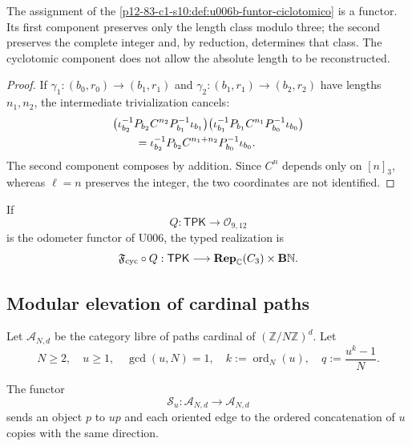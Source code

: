 {\begin{theorem}
\label{p12-83-c1-s10:thm:u006b-functorialidad}
The assignment of the \cref{p12-83-c1-s10:def:u006b-funtor-ciclotomico} is a functor. Its
first component preserves only the length class modulo three; the
second preserves the complete integer and, by reduction, determines that class.
The cyclotomic component does not allow the absolute length to be reconstructed.
\end{theorem}

\begin{proof}
If \(\gamma_1:(b_0,r_0)\to(b_1,r_1)\) and
\(\gamma_2:(b_1,r_1)\to(b_2,r_2)\) have lengths \(n_1,n_2\), the
intermediate trivialization cancels:
\begin{align}
 &\bigl(
 \iota_{b_2}^{-1}P_{b_2}C^{n_2}P_{b_1}^{-1}\iota_{b_1}
 \bigr)
 \bigl(
 \iota_{b_1}^{-1}P_{b_1}C^{n_1}P_{b_0}^{-1}\iota_{b_0}
 \bigr)\notag\\
 &\qquad=
 \iota_{b_2}^{-1}P_{b_2}C^{n_1+n_2}
 P_{b_0}^{-1}\iota_{b_0}.
 \label{p12-83-c1-s10:eq:u006b-composicion-funtor}
\end{align}
The second component composes by addition. Since \(C^n\) depends only on
\([n]_3\), whereas \(\ell=n\) preserves the integer, the two coordinates are not
identified.
\end{proof}

If
\[
 Q:\mathsf{TPK}\longrightarrow\mathcal O_{9,12}
\]
is the odometer functor of U006, the typed realization is
\begin{equation}
 \mathfrak F_{\rm cyc}\circ Q:
 \mathsf{TPK}\longrightarrow
 \mathbf{Rep}_{\mathbb C}(C_3)\times\mathbf B\mathbb N.
 \label{p12-83-c1-s10:eq:u006b-compuesto-tpk-ciclotomico}
\end{equation}

\subsection{Modular elevation of cardinal paths}

Let \(\mathcal A_{N,d}\) be the category libre of paths cardinal of
\((\mathbb Z/N\mathbb Z)^d\). Let
\[
 N\ge2,\quad u\ge1,\quad\gcd(u,N)=1,
 \quad k:=\operatorname{ord}_N(u),
 \quad q:=\frac{u^k-1}{N}.
\]

\begin{definition}
\label{p12-83-c1-s10:def:u006b-sustitucion-cardinal}
The functor
\[
 \mathcal S_u:\mathcal A_{N,d}\longrightarrow\mathcal A_{N,d}
\]
sends an object \(p\) to \(up\) and each oriented edge to the ordered concatenation of \(u\) copies with the same direction.
\end{definition}

}
